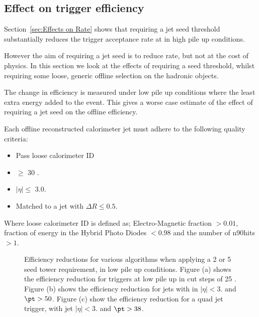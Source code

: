 
\subsection{Effect on trigger efficiency} %
\label{sec:Effects of requiring a jet seed on offline efficiency}
Section~\ref{sec:Effects on Rate} shows that requiring a jet seed threshold
substantially reduces the trigger acceptance rate at in high pile up conditions.

However the aim of requiring a jet seed is to reduce rate, but not at the cost 
of physics. In this section we look at the effects of requiring a seed 
threshold, whilst requiring some loose, generic offline selection on the 
hadronic objects.

The change in efficiency is measured under low pile up conditions where the 
least extra energy added to the event. This gives a worse case estimate of the 
effect of requiring a jet seed on the offline efficiency.

Each offline reconstructed calorimeter jet must adhere to the following quality 
criteria:
\begin{itemize}
\item Pass loose calorimeter ID 
\item \PT $\geq$ 30 \GeV.
\item $|\eta| \leq$ 3.0.
\item Matched to a \Lone jet with $\Delta R \leq 0.5$.
\end{itemize}
Where loose calorimeter ID is defined as; Electro-Magnetic fraction $> 0.01$, 
fraction of energy in the Hybrid Photo Diodes $< 
0.98$ and the number of n90hits $> 1$.

\begin{figure}[h!]
    \centering
     \newline
    \caption{Efficiency reductions for various \Lone algorithms when applying a 
    2 or 5 \GeV seed tower requirement, in low pile up 
    conditions. Figure (a) shows the efficiency reduction for \HT triggers at 
    low pile up in cut steps of 25 \GeV. Figure (b) 
    shows the efficiency reduction for jets with in $|\eta| <3.$ and $\pt > 
    50$\GeV. Figure (c) show the efficiency reduction for a quad jet trigger, 
    with jet $|\eta| <3.$ and $\pt > 38$\GeV.}
    
    \label{fig:lowpuratereduction}
\end{figure}



